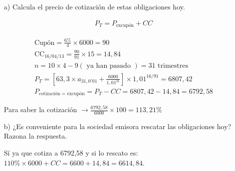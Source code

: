 \begin{enumerate}
    \item[a)] Calcula el precio de cotización de estas obligaciones hoy.
    
    \begin{align*}
        P_T = P_{\text{excupón}} + CC 
    \end{align*}

    \begin{center}
    \end{center}

    \begin{align*}
        \text{Cupón} = \frac{6\%}{4} \times 6000 = 90 \\
        \text{CC}_{16/04/13} = \frac{90}{91} \times 15 = 14,84 \\
        n = 10 \times 4 - 9 (\text{ ya han pasado })= 31 \text{ trimestres } \\
        P_T = \left[63,3 \times a_{31,0'01} + \frac{6000}{1,01^{31}}\right] \times 1,01^{16/91} = 6807,42\\
        P_{\text{cotización = excupón}} = P_T - CC = 6807,42 - 14,84 = 6792,58
    \end{align*}

    Para saber la cotización $\rightarrow \frac{6792,58}{6000} \times 100 = 113,21\%$



    \item[b)] ¿Es conveniente para la sociedad emisora rescatar las obligaciones hoy? Razona la respuesta.

    Sí ya que cotiza a 6792,58 y si lo rescato es: $110\% \times 6000 + CC = 6600 + 14,84 = 6614,84$.


\end{enumerate}
